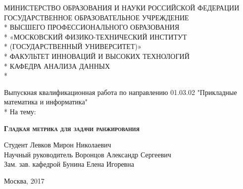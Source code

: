\documentclass[14pt,a4paper]{amsart}
\theoremstyle{definition}
\theoremstyle{definition}
\begin{document}
\begin{titlepage}
  \newpage
  
  \begin{center}
    МИНИСТЕРСТВО ОБРАЗОВАНИЯ И НАУКИ РОССИЙСКОЙ ФЕДЕРАЦИИ \\
    \vspace{0.5cm}
    ГОСУДАРСТВЕННОЕ ОБРАЗОВАТЕЛЬНОЕ УЧРЕЖДЕНИЕ \\* 
    ВЫСШЕГО ПРОФЕССИОНАЛЬНОГО ОБРАЗОВАНИЯ \\* 
    «МОСКОВСКИЙ ФИЗИКО-ТЕХНИЧЕСКИЙ ИНСТИТУТ \\* 
    (ГОСУДАРСТВЕННЫЙ УНИВЕРСИТЕТ)» \\*
    \vspace{0.5cm}
    ФАКУЛЬТЕТ ИННОВАЦИЙ И ВЫСОКИХ ТЕХНОЛОГИЙ \\*
    КАФЕДРА АНАЛИЗА ДАННЫХ \\*
    \hrulefill
  \end{center}
  
  \vspace{2em}
  
  \begin{center}
    \Large Выпускная квалификационная работа по направлению 01.03.02 "Прикладные математика и информатика"\\*
    На тему:
  \end{center}
  
  
  \vspace{1.5em}
  
  \begin{center}
    \textsc{\textbf{Гладкая метрика для задачи ранжирования}}
  \end{center}
  
  \vspace{3em}
  
  \begin{flushleft}
    Студент \hrulefill Левков Мирон Николаевич \\
    \vspace{1.5em}
    Научный руководитель \hrulefill Воронцов Александр Сергеевич\\
    \vspace{1.5em}
    Зам. зав. кафедрой   \hrulefill Бунина Елена Игоревна
  \end{flushleft}
  
  \vspace{\fill}
  
  \begin{center}
    Москва, 2017
  \end{center}
  
\end{titlepage}
\setcounter{page}{2}
\end{document}

